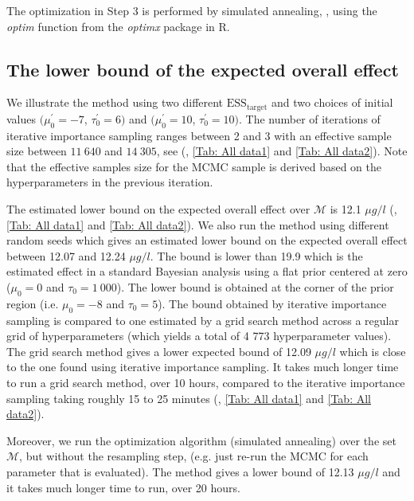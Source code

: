 \documentclass{amsart}
\theoremstyle{plain}%
\begin{document}
The optimization in Step 3 is performed by simulated annealing, \citep{Du_2016, Henderson_2003}, 
using the \emph{optim} function from the \emph {optimx} package \citep{Nash_2011} in R. 


\subsection{The lower bound of the expected overall effect}

We illustrate the method using two different $\mathrm{ESS_{target}}$ and two choices of initial values $(\mu_0^\prime = -7$, $\tau_0^\prime = 6)$ and $(\mu_0^\prime = 10$, $\tau_0^\prime = 10)$. The number of iterations of iterative importance sampling ranges between 2 and 3 with an effective sample size between $11~640$ and $14~305$, see (, \ref{Tab: All data1} and \ref{Tab: All data2}). Note that the effective samples size for the MCMC sample is derived based on the hyperparameters in the previous iteration.

The estimated lower bound on the expected 
overall effect over $\mathcal{M}$ is 12.1 $\mu g/ l$ (, \ref{Tab: All data1} and  \ref{Tab: All data2}). 
We also run the method using different random seeds which gives an estimated lower bound on the expected overall effect between 12.07 and 12.24 $\mu g/ l$.
The bound is lower than 19.9 
which is the estimated effect in a standard Bayesian analysis using a flat prior centered at zero ($\mu_0 = 0$ and $\tau_0 = 1~000$). The lower bound is obtained at the corner of the prior region (i.e. $\mu_0 = -8$ and  $\tau_0 = 5$).
The bound obtained by iterative importance sampling is compared to one estimated by a grid search method across a regular grid of hyperparameters (which yields a total of 4 773 hyperparameter values). The grid search method gives a lower expected bound of 12.09 $\mu g/ l$ which is close to the one found using iterative importance sampling. It takes much longer time to run a grid search method, over 10 hours, compared to the iterative importance sampling taking roughly 15 to 25 minutes (, \ref{Tab: All data1} and  \ref{Tab: All data2}). 

Moreover, we run the optimization algorithm (simulated annealing) over the set $\mathcal{M}$, but without the resampling step, (e.g. just re-run the MCMC for each parameter that is evaluated). The method gives a lower bound of 12.13 $\mu g/ l$ and it takes much longer time to run, over 20 hours. 
\end{document}
